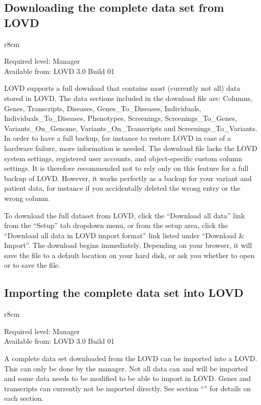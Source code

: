 \hypertarget{ssec:download_full_data}{}
\subsection{Downloading the complete data set from LOVD}
\begin{wrapfigure}[3]{r}{8cm} %
  \vspace{-25pt}
  \begin{leftbar}
    Required level: Manager\\
    Available from: LOVD 3.0 Build 01
  \end{leftbar}
\end{wrapfigure}
LOVD supports a full download that contains most (currently not all) data stored in LOVD.
The data sections included in the download file are:
 Columns, Genes, Transcripts, Diseases, Genes\_To\_Diseases, Individuals, Individuals\_To\_Diseases,
 Phenotypes, Screenings, Screenings\_To\_Genes, Variants\_On\_Genome, Variants\_On\_Transcripts
 and Screenings\_To\_Variants.
In order to have a full backup, for instance to restore LOVD in case of a hardware failure,
 more information is needed.
The download file lacks the LOVD system settings, registered user accounts, and object-specific custom column settings.
It is therefore recommended not to rely only on this feature for a full backup of LOVD.
However, it works perfectly as a backup for your variant and patient data, for instance if you accidentally
 deleted the wrong entry or the wrong column.

To download the full dataset from LOVD, click the ``Download all data'' link from the ``Setup'' tab dropdown
 menu, or from the setup area, click the ``Download all data in LOVD import format'' link listed under
 ``Download \& Import''.
The download begins immediately.
Depending on your browser, it will save the file to a default location on your hard disk,
 or ask you whether to open or to save the file.



\subsection{Importing the complete data set into LOVD}
\label{ssec:importing_full_data}
\begin{wrapfigure}[3]{r}{8cm} %
  \vspace{-25pt}
  \begin{leftbar}
    Required level: Manager\\
    Available from: LOVD 3.0 Build 01
  \end{leftbar}
\end{wrapfigure}
A complete data set downloaded from the LOVD can be imported into a LOVD.
This can only be done by the manager.
Not all data can and will be imported and some data needs to be modified to be able to import in LOVD.
Genes and transcripts can currently not be imported directly.
See section ``'' for details on each section.





